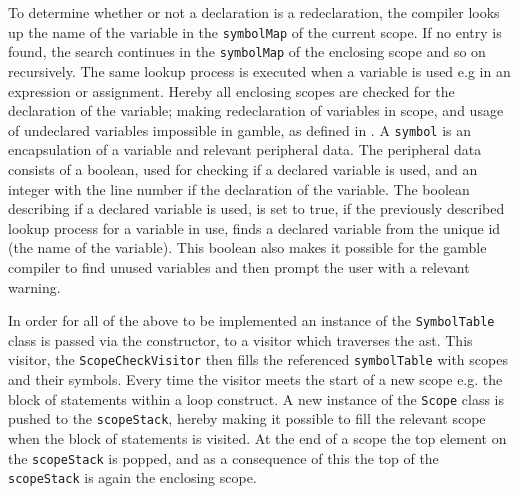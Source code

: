 To determine whether or not a declaration is a redeclaration, the compiler looks up the name of the variable in the \texttt{symbolMap} of the current scope.
If no entry is found, the search continues in the \texttt{symbolMap} of the enclosing scope and so on recursively.
The same lookup process is executed when a variable is used e.g in an expression or assignment.
Hereby all enclosing scopes are checked for the declaration of the variable; making redeclaration of variables in scope, and usage of undeclared variables impossible in \gls{gamble}, as defined in .
A \texttt{symbol} is an encapsulation of a variable and relevant peripheral data.
The peripheral data consists of a boolean, used for checking if a declared variable is used, and an integer with the line number if the declaration of the variable.
The boolean describing if a declared variable is used, is set to true, if the previously described lookup process for a variable in use, finds a declared variable from the unique id (the name of the variable).
This boolean also makes it possible for the \gls{gamble} compiler to find unused variables and then prompt the user with a relevant warning.

In order for all of the above to be implemented an instance of the \texttt{SymbolTable} class is passed via the constructor, to a visitor which traverses the \acrshort{ast}.
This visitor, the \texttt{ScopeCheckVisitor} then fills the referenced \texttt{symbolTable} with scopes and their symbols.
Every time the visitor meets the start of a new scope e.g. the block of statements within a loop construct.
A new instance of the \texttt{Scope} class is pushed to the \texttt{scopeStack}, hereby making it possible to fill the relevant scope when the block of statements is visited.
At the end of a scope the top element on the \texttt{scopeStack} is popped, and as a consequence of this the top of the \texttt{scopeStack} is again the enclosing scope.